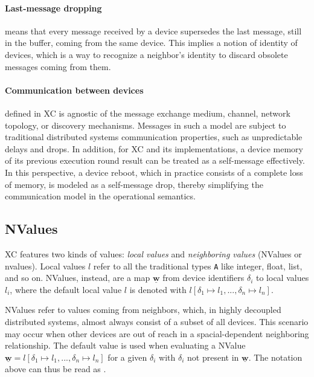 \paragraph{Last-message dropping} means that every message received by a device supersedes the last message, still in the buffer, coming from the same device.\cite{xc}
%
This implies a notion of identity of devices, which is a way to recognize a neighbor's identity to discard obsolete messages coming from them.

\paragraph{Communication between devices} defined in \ac{XC} is agnostic of the message exchange medium, channel, network topology, or discovery mechanisms.
%
Messages in such a model are subject to traditional distributed systems communication properties, such as unpredictable delays and drops\cite{xc}.
%
In addition, for \ac{XC} and its implementations, a device memory of its previous execution round result can be treated as a self-message effectively.
%
In this perspective, a device reboot, which in practice consists of a complete loss of memory, is modeled as a self-message drop, thereby simplifying the communication model in the operational semantics.

\subsection{NValues} \label{chap:background->sec:xc->subsec:nvalues}

\ac{XC} features two kinds of values: \textit{local values} and \textit{neighboring values} (NValues or nvalues).
%
Local values $l$ refer to all the traditional types \texttt{A} like integer, float, list, and so on.
%
NValues, instead, are a map $\underline{\mathbf{w}}$ from device identifiers $\delta_i$ to local values $l_i$, where the default local value $l$ is denoted with $l[\delta_1 \mapsto l_1, ..., \delta_n \mapsto l_n]$\cite{xc}.

NValues refer to values coming from neighbors, which, in highly decoupled distributed systems, almost always consist of a subset of all devices.
%
This scenario may occur when other devices are out of reach in a spacial-dependent neighboring relationship.
%
The default value is used when evaluating a NValue $\underline{\mathbf{w}} = l[\delta_1 \mapsto l_1, ..., \delta_n \mapsto l_n]$ for a given $\delta_i$ with $\delta_i$ not present in $\underline{\mathbf{w}}$.
%
The notation above can thus be read as \cite{xc}.

